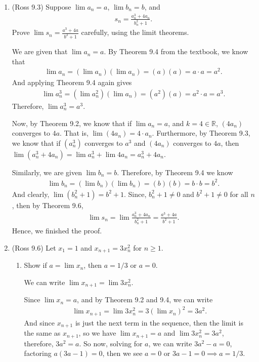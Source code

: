 \documentclass [10pt]{article}
\newcommand{\jg}[1]{{\color{blue} #1}}
\begin{document}
\begin{enumerate}
\item (Ross 9.3) Suppose $\lim a_n = a$, $\lim b_n = b$, and \begin{align*}
s_n = \frac{a_n^3+4a_n}{b_n^2+1}.
\end{align*}
Prove $\lim s_n = \frac{a^3+4a}{b^2+1}$ carefully, using the limit theorems.

\jg{
We are given that $\lim a_n = a$. By Theorem 9.4 from the textbook, we know that
\begin{align*}
    \lim a_n = (\lim a_n) (\lim a_n) = (a)(a) = a \cdot a = a^2.
\end{align*}
And applying Theorem 9.4 again gives
\begin{align*}
    \lim a_n^3 = (\lim a_n^2) (\lim a_n) = (a^2) (a) = a^2 \cdot a = a^3.
\end{align*}
Therefore, $\lim a_n^3 = a^3$. 

Now, by Theorem 9.2, we know that if $\lim a_n = a$, and $k = 4 \in \mathbb{R}$, $(4a_n)$ converges to $4a$. That is, $\lim (4a_n) = 4 \cdot a_n$. Furthermore, by Theorem 9.3, we know that if $(a_n^3)$ converges to $a^3$ and $(4a_n)$ converges to $4a$, then $\lim (a^3_n + 4a_n) = \lim a_n^3 + \lim 4a_n = a^3_n + 4a_n$.  

Similarly, we are given $\lim b_n = b$. Therefore, by Theorem 9.4 we know 
\begin{align*}
    \lim b_n = (\lim b_n) (\lim b_n) = (b) (b) = b \cdot b = b^2. 
\end{align*}
And clearly, $\lim (b_n^2 + 1) = b^2 + 1$. Since, $b_n^2 + 1 \neq 0$ and $b^2 + 1 \neq 0$ for all $n$, then by Theorem 9.6,
\begin{align*}
    \lim s_n = \lim \frac{a_n^3+4a_n}{b_n^2+1} = \frac{a^3+4a}{b^2+1}.
\end{align*}
Hence, we finished the proof. 
}
\clearpage
\item (Ross 9.6) Let $x_1 = 1$ and $x_{n+1} = 3x^2_n
$ for $n \geq 1$.
\begin{enumerate}
\item Show if $a = \lim x_n$, then $a = 1/3$ or $a = 0$.

\jg{
We can write $\lim x_{n+1} = \lim 3 x_n^2$.

Since $\lim x_n = a$, and by Theorem 9.2 and 9.4, we can write 
\begin{align*}
    \lim x_{n+1} = \lim 3 x_n^2 = 3 (\lim x_n)^2 = 3a^2.
\end{align*}
And since $x_{n+1}$ is just the next term in the sequence, then the limit is the same as $x_{n+1}$, so we have $\lim x_{n+1} = a$ and $\lim 3x_n^2 = 3a^2$, therefore, $3a^2 = a$. So now, solving for $a$, we can write $3a^2 - a = 0$, factoring $a(3a - 1) = 0$, then we see $a = 0$ or $3a - 1 = 0 \implies a = 1/3$.

}
\end{enumerate}
\end{enumerate}
\end{document}
